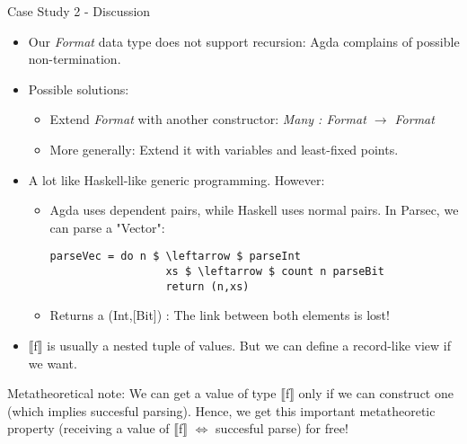 \documentclass[10pt]{beamer}
\begin{document}
\begin{frame}[fragile]{Case Study 2 - Discussion}

\begin{itemize}
\item Our \textit{Format} data type does not support recursion: Agda complains of possible non-termination.
\item Possible solutions:
	\begin{itemize}
	\item Extend \textit{Format} with another constructor: \textit{Many : Format $ \rightarrow $ Format}
	\item More generally: Extend it with variables and least-fixed points.
	\end{itemize}
\item A lot like Haskell-like generic programming. However:
	\begin{itemize}
	\item Agda uses dependent pairs, while Haskell uses normal pairs. In Parsec, we can parse a "Vector":
	\begin{lstlisting}[mathescape=true]
	parseVec = do n $ \leftarrow $ parseInt
	              xs $ \leftarrow $ count n parseBit
	              return (n,xs)
	\end{lstlisting}
	\item Returns a (Int,[Bit]) : The link between both elements is lost!
	\end{itemize}
\item $\llbracket$f$\rrbracket$ is usually a nested tuple of values. But we can define a record-like view if we want.
\end{itemize}
Metatheoretical note: We can get a value of type $\llbracket$f$\rrbracket$ only if we can construct one (which implies succesful parsing). Hence, we get this important metatheoretic property (receiving a value of $\llbracket$f$\rrbracket$ $\Leftrightarrow$ succesful parse) for free!

\end{frame}
\end{document}
